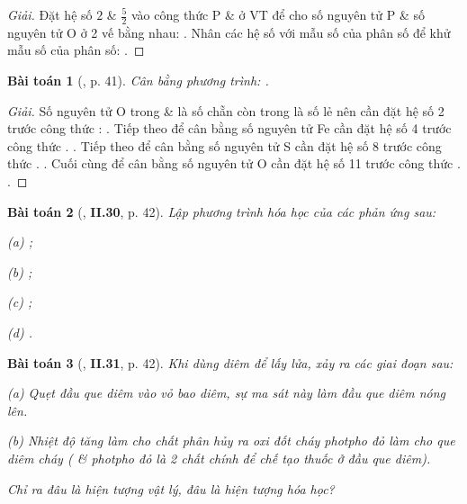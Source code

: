 \documentclass{article}
\numberwithin{equation}{section}
\newtheorem{baitoan}{Bài toán}
\begin{document}
\begin{proof}[Giải]
	Đặt hệ số $2$ \& $\frac{5}{2}$ vào công thức P \&  ở VT để cho số nguyên tử P \& số nguyên tử O ở 2 vế bằng nhau: . Nhân các hệ số với mẫu số của phân số để khử mẫu số của phân số: .
\end{proof}

\begin{baitoan}[\cite{Truong_BTNC_Hoa_Hoc_8_2022}, p. 41]
	Cân bằng phương trình: \emph{}.
\end{baitoan}

\begin{proof}[Giải]
	Số nguyên tử O trong  \&  là số chẵn còn trong  là số lẻ nên cần đặt hệ số 2 trước công thức : . Tiếp theo để cân bằng số nguyên tử Fe cần đặt hệ số 4 trước công thức . . Tiếp theo để cân bằng số nguyên tử S cần đặt hệ số 8 trước công thức . . Cuối cùng để cân bằng số nguyên tử O cần đặt hệ số 11 trước công thức . .
\end{proof}

\begin{baitoan}[\cite{Truong_BTNC_Hoa_Hoc_8_2022}, \textbf{II.30}, p. 42]
	Lập phương trình hóa học của các phản ứng sau:
	\begin{enumerate*}
		\item[(a)] \emph{};
		\item[(b)] \emph{};
		\item[(c)] \emph{};
		\item[(d)] \emph{}.
	\end{enumerate*}
\end{baitoan}

\begin{baitoan}[\cite{Truong_BTNC_Hoa_Hoc_8_2022}, \textbf{II.31}, p. 42]
	Khi dùng diêm để lấy lửa, xảy ra các giai đoạn sau:
	\begin{enumerate*}
		\item[(a)] Quẹt đầu que diêm vào vỏ bao diêm, sự ma sát này làm đầu que diêm nóng lên.
		\item[(b)] Nhiệt độ tăng làm cho chất \emph{} phân hủy ra oxi đốt cháy photpho đỏ làm cho que diêm cháy (\emph{} \& photpho đỏ là 2 chất chính để chế tạo thuốc ở đầu que diêm).
	\end{enumerate*}
	Chỉ ra đâu là hiện tượng vật lý, đâu là hiện tượng hóa học?
\end{baitoan}
\end{document}
